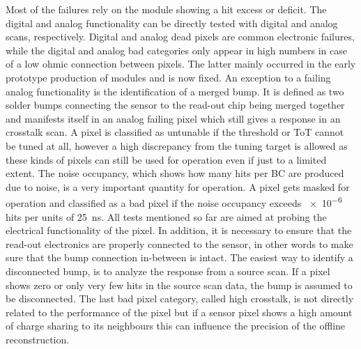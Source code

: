 Most of the failures rely on the module showing a hit excess or deficit. The digital and analog functionality can be directly tested with digital and analog scans, respectively. Digital and analog dead pixels are common electronic failures, while the digital and analog bad categories only appear in high numbers in case of a low ohmic connection between pixels. The latter mainly occurred in the early prototype production of modules and is now fixed. An exception to a failing analog functionality is the identification of a merged bump. It is defined as two solder bumps connecting the sensor to the read-out chip being merged together and manifests itself in an analog failing pixel which still gives a response in an crosstalk scan. A pixel is classified as untunable if the threshold or ToT cannot be tuned at all, however a high discrepancy from the tuning target is allowed as these kinds of pixels can still be used for operation even if just to a limited extent. The noise occupancy, which shows how many hits per BC are produced due to noise, is a very important quantity for operation. A pixel gets masked for operation and classified as a bad pixel if the noise occupancy exceeds \num{e-6} hits per units of \SI{25}{\nano\second}. All tests mentioned so far are aimed at probing the electrical functionality of the pixel. In addition, it is necessary to ensure that the read-out electronics are properly connected to the sensor, in other words to make sure that the bump connection in-between is intact. The easiest way to identify a disconnected bump, is to analyze the response from a source scan. If a pixel shows zero or only very few hits in the source scan data, the bump is assumed to be disconnected. The last bad pixel category, called high crosstalk, is not directly related to the performance of the pixel but if a sensor pixel shows a high amount of charge sharing to its neighbours this can influence the precision of the offline reconstruction.

